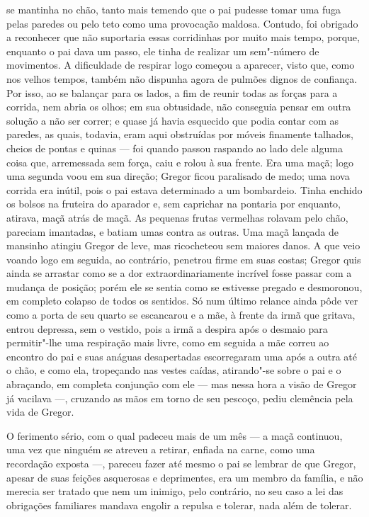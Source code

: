 se mantinha no chão, tanto mais temendo que o pai pudesse tomar uma fuga
pelas paredes ou pelo teto como uma provocação maldosa. Contudo, foi
obrigado a reconhecer que não suportaria essas corridinhas por muito mais
tempo, porque, enquanto o pai dava um passo, ele tinha de realizar um
sem"-número de movimentos. A dificuldade de respirar logo começou a
aparecer, visto que, como nos velhos tempos, também não dispunha agora de
pulmões dignos de confiança. Por isso, ao se balançar para os lados, a fim
de reunir todas as forças para a corrida, nem abria os olhos; em sua
obtusidade, não conseguia pensar em outra solução a não ser correr; e
quase já havia esquecido que podia contar com as paredes, as quais,
todavia, eram aqui obstruídas por móveis finamente talhados, cheios de
pontas e quinas --- foi quando passou raspando ao lado dele alguma coisa
que, arremessada sem força, caiu e rolou à sua frente. Era uma maçã; logo
uma segunda voou em sua direção; Gregor ficou paralisado de medo; uma nova
corrida era inútil, pois o pai estava determinado a um bombardeio. Tinha
enchido os bolsos na fruteira do aparador e, sem caprichar na pontaria por
enquanto, atirava, maçã atrás de maçã. As pequenas frutas vermelhas
rolavam pelo chão, pareciam imantadas, e batiam umas contra as outras. Uma
maçã lançada de mansinho atingiu Gregor de leve, mas ricocheteou sem
maiores danos. A que veio voando logo em seguida, ao contrário, penetrou
firme em suas costas; Gregor quis ainda se arrastar como se a dor
extraordinariamente incrível fosse passar com a mudança de posição; porém
ele se sentia como se estivesse pregado e desmoronou, em completo colapso
de todos os sentidos. Só num último relance ainda pôde ver como a porta de
seu quarto se escancarou e a mãe, à frente da irmã que gritava, entrou
depressa, sem o vestido, pois a irmã a despira após o desmaio para
permitir"-lhe uma respiração mais livre, como em seguida a mãe correu ao
encontro do pai e suas anáguas desapertadas escorregaram uma após a outra
até o chão, e como ela, tropeçando nas vestes caídas, atirando"-se sobre o
pai e o abraçando, em completa conjunção com ele --- mas nessa hora a visão
de Gregor já vacilava ---, cruzando as mãos em torno de seu pescoço, pediu
clemência pela vida de Gregor. 

\pagebreak
\sectionitem

O ferimento sério, com o qual padeceu mais de um mês --- a maçã continuou,
uma vez que ninguém se atreveu a retirar, enfiada na carne, como uma
recordação exposta ---, pareceu fazer até mesmo o pai se lembrar de que
Gregor, apesar de suas feições asquerosas e deprimentes, era um membro da
família, e não merecia ser tratado que nem um inimigo, pelo contrário, no
seu caso a lei das obrigações familiares mandava engolir a repulsa e
tolerar, nada além de tolerar.

